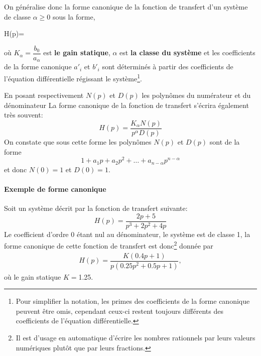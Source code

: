 On généralise donc la forme canonique de la fonction de transfert d'un 
système de classe $\alpha\ge0$ sous la forme, 
\begin{bequation}
    H(p)=
    \cdot
    \label{eq-ftcan} 
\end{bequation}
où $K_\alpha=\dfrac{b_0}{a_\alpha}$ est \textbf{le gain statique}, 
$\alpha$ est \textbf{la classe du système} et les coefficients de la forme 
canonique $a'_i$ et $b'_i$ sont déterminés à partir des coefficients 
de l'équation différentielle régissant le système\footnote{Pour simplifier 
la notation, les primes des coefficients de la forme canonique peuvent 
être omis, cependant ceux-ci restent toujours différents des coefficients 
de l'équation différentielle.}.

En posant respectivement $N(p)$ et $D(p)$ les polynômes du numérateur 
et du dénominateur La forme canonique de la fonction de transfert 
s'écrira également très souvent:
\[
    H(p)=\dfrac{K_\alpha N(p)}{p^\alpha D(p)}
\]
On constate que sous cette forme les polynômes $N(p)$ et $D(p)$ sont 
de la forme 
\[
    1+a_1p+a_2p^2+\ldots+a_{n-\alpha}p^{n-\alpha}
\]
et donc $N(0)=1$ et $D(0)=1$.
\paragraph{Exemple de forme canonique}
Soit un système décrit par la fonction de transfert suivante:
\[
    H(p)=\dfrac{2p+5}{p^3+2p^2+4p}
\]
Le coefficient d'ordre 0 étant nul au dénominateur, le système est de classe 1, 
la forme canonique de cette fonction de transfert est 
donc\footnote{Il est d'usage en automatique d'écrire les nombres rationnels 
par leurs valeurs numériques plutôt que par leurs fractions. } donnée par
\begin{align*}
    H(p)=\dfrac{K(0.4p+1)}{p(0.25p^2+0.5p+1)},
\end{align*}
où le gain statique $K=$1.25.

